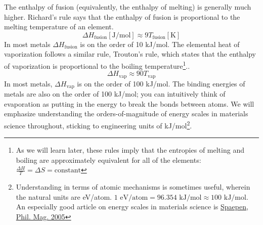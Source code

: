 \documentclass[12pt]{article}
\begin{document}
The enthalpy of fusion (equivalently, the enthalpy of melting) is generally much higher. Richard's rule says that the enthalpy of fusion is proportional to the melting temperature of an element. 
%
\begin{equation}
\Delta H_\text{fusion} [\text{J/mol}] \approx 9 T_\text{fusion} [\text{K}]
\end{equation}
In most metals $\Delta H_\text{fusion}$ is on the order of 10 kJ/mol.  The elemental heat of vaporization follows a similar rule, Trouton's rule, which states that the enthalpy of vaporization is proportional to the boiling temperature\footnote{As we will learn later, these rules imply that the entropies of melting and boiling are approximately equivalent for all of the elements: $\frac{\Delta H}{T}=\Delta S = \text{constant}$}..
\begin{equation}
\Delta H_\text{vap} \approx 90 T_\text{vap}
\end{equation}
In most metals,  $\Delta H_\text{vap}$ is on the order of 100 kJ/mol.  The binding energies of metals are also on the order of 100 kJ/mol; you can intuitively think of evaporation as putting in the energy to break the bonds between atoms. We will emphasize understanding the orders-of-magnitude of energy scales in materials science throughout, sticking to engineering units of kJ/mol\footnote{Understanding in terms of atomic mechanisms is sometimes useful, wherein the natural units are eV/atom. $1 \text{ eV/atom}= 96.354\text{ kJ/mol}\approx 100\text{ kJ/mol}$. An especially good article on energy scales in materials science is  \href{http://dx.doi.org/10.1080/14786430500155080}{Spaepen, Phil. Mag. 2005}}.
\end{document}
